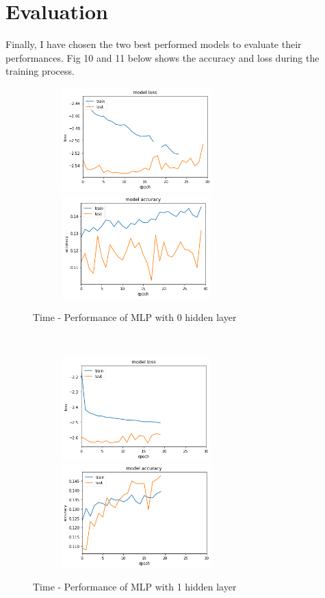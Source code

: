 \documentclass[letterpaper, 12 pt, conference]{ieeeconf}  %
\begin{document}
\section{Evaluation}
Finally, I have chosen the two best performed models to evaluate their performances. Fig 10 and 11 below shows the accuracy and loss during the training process.\\
\begin{figure}[h]
	\includegraphics[width=8cm, height=4cm]{./figs/mlp-loss_1.png}\\
	\includegraphics[width=8cm, height=4cm]{./figs/mlp-accuracy_1.png}
	\caption{Time - Performance of MLP with 0 hidden layer}
	\label{fig:boat1}
\end{figure}\\
\begin{figure}[h]
	\includegraphics[width=8cm, height=4cm]{./figs/mlp-loss_2.png}\\
	\includegraphics[width=8cm, height=4cm]{./figs/mlp-accuracy_2.png}
	\caption{Time - Performance of MLP with 1 hidden layer}
	\label{fig:boat1}
\end{figure}\\
\end{document}
